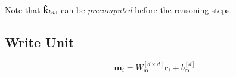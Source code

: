 Note that $\mathbf{\hat{k}}_{hw}$ can be \emph{precomputed} before the reasoning steps.

\subsection*{Write Unit}

\begin{equation}
\mathbf{m}_i = W_{\textsf{m}}^{[d \times d]} \mathbf{r}_i + b_{\textsf{m}}^{[d]} \tag{w1}
\end{equation}